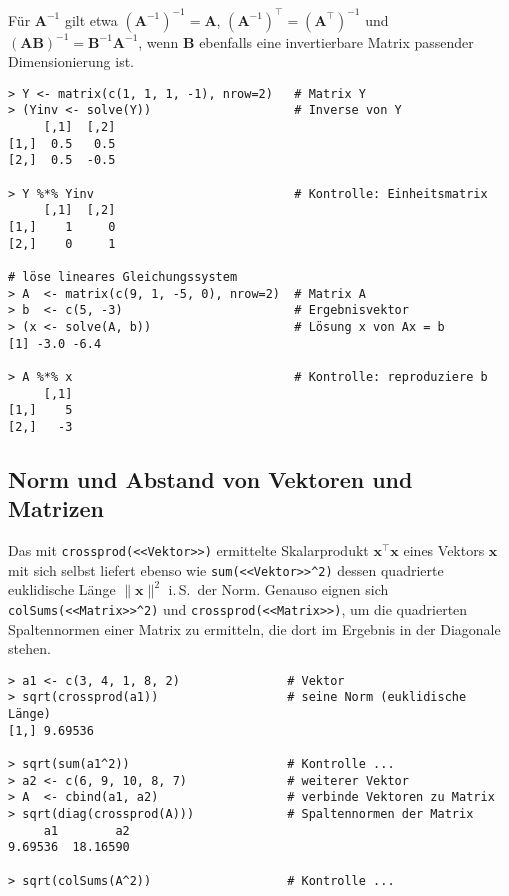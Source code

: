 Für $\bm{A}^{-1}$ gilt etwa $(\bm{A}^{-1})^{-1} = \bm{A}$, $(\bm{A}^{-1})^{\top} = (\bm{A}^{\top})^{-1}$ und $(\bm{A} \bm{B})^{-1} = \bm{B}^{-1} \bm{A}^{-1}$, wenn $\bm{B}$ ebenfalls eine invertierbare Matrix passender Dimensionierung ist.
\begin{lstlisting}
> Y <- matrix(c(1, 1, 1, -1), nrow=2)   # Matrix Y
> (Yinv <- solve(Y))                    # Inverse von Y
     [,1]  [,2]
[1,]  0.5   0.5
[2,]  0.5  -0.5

> Y %*% Yinv                            # Kontrolle: Einheitsmatrix
     [,1]  [,2]
[1,]    1     0
[2,]    0     1

# löse lineares Gleichungssystem
> A  <- matrix(c(9, 1, -5, 0), nrow=2)  # Matrix A
> b  <- c(5, -3)                        # Ergebnisvektor
> (x <- solve(A, b))                    # Lösung x von Ax = b
[1] -3.0 -6.4

> A %*% x                               # Kontrolle: reproduziere b
     [,1]
[1,]    5
[2,]   -3
\end{lstlisting}

\subsection{Norm und Abstand von Vektoren und Matrizen}
\label{sec:matNorm}

Das mit \lstinline!crossprod(<<Vektor>>)! ermittelte Skalarprodukt $\bm{x}^{\top} \bm{x}$ eines Vektors $\bm{x}$ mit sich selbst liefert ebenso wie \lstinline!sum(<<Vektor>>^2)! dessen quadrierte euklidische Länge $\|\bm{x}\|^{2}$ i.\,S.\ der Norm. Genauso eignen sich \lstinline!colSums(<<Matrix>>^2)! und \lstinline!crossprod(<<Matrix>>)!, um die quadrierten Spaltennormen einer Matrix zu ermitteln, die dort im Ergebnis in der Diagonale stehen.
\begin{lstlisting}
> a1 <- c(3, 4, 1, 8, 2)               # Vektor
> sqrt(crossprod(a1))                  # seine Norm (euklidische Länge)
[1,] 9.69536

> sqrt(sum(a1^2))                      # Kontrolle ...
> a2 <- c(6, 9, 10, 8, 7)              # weiterer Vektor
> A  <- cbind(a1, a2)                  # verbinde Vektoren zu Matrix
> sqrt(diag(crossprod(A)))             # Spaltennormen der Matrix
     a1        a2
9.69536  18.16590

> sqrt(colSums(A^2))                   # Kontrolle ...
\end{lstlisting}

